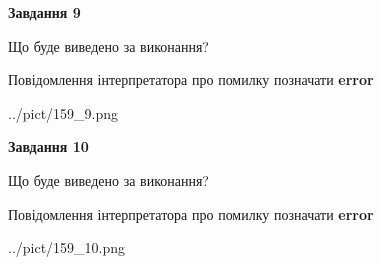 \documentclass[12pt, ukrainian]{article}
\begin{document}
{{\begin {center}\textbf{Завдання 9}\end {center}}\par
Що буде виведено за виконання? \par
Повідомлення інтерпретатора про помилку позначати \textbf{error}

\begin{center}
	{../pict/159_9.png}
\end{center}
\newpage

{\begin {center}\textbf{Завдання 10}\end {center}}\par
Що буде виведено за виконання? \par
Повідомлення інтерпретатора про помилку позначати \textbf{error}

\begin{center}
	{../pict/159_10.png}
\end{center}
\newpage

}
\end{document}
